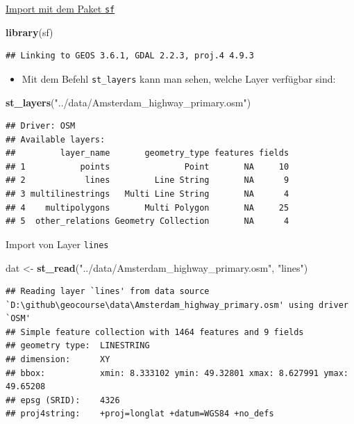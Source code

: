 \documentclass[ignorenonframetext,]{beamer}
\newenvironment{Shaded}{\begin{snugshade}}{\end{snugshade}}
\newcommand{\KeywordTok}[1]{\textcolor[rgb]{0.26,0.66,0.93}{\textbf{#1}}}
\newcommand{\NormalTok}[1]{\textcolor[rgb]{0.74,0.68,0.62}{#1}}
\newcommand{\StringTok}[1]{\textcolor[rgb]{0.02,0.61,0.04}{#1}}
\providecommand{\tightlist}{%
  \setlength{\itemsep}{0pt}\setlength{\parskip}{0pt}}
\begin{document}
\begin{frame}[fragile]{\href{https://cran.r-project.org/web/packages/sf/vignettes/sf2.html}{Import
mit dem Paket \texttt{sf}}}
\protect\hypertarget{import-mit-dem-paket-sf}{}

\begin{Shaded}
\begin{Highlighting}[]
\KeywordTok{library}\NormalTok{(sf)}
\end{Highlighting}
\end{Shaded}

\begin{verbatim}
## Linking to GEOS 3.6.1, GDAL 2.2.3, proj.4 4.9.3
\end{verbatim}

\begin{itemize}[<+->]
\tightlist
\item
  Mit dem Befehl \texttt{st\_layers} kann man sehen, welche Layer
  verfügbar sind:
\end{itemize}

\begin{Shaded}
\begin{Highlighting}[]
\KeywordTok{st_layers}\NormalTok{(}\StringTok{"../data/Amsterdam_highway_primary.osm"}\NormalTok{)}
\end{Highlighting}
\end{Shaded}

\begin{verbatim}
## Driver: OSM 
## Available layers:
##         layer_name       geometry_type features fields
## 1           points               Point       NA     10
## 2            lines         Line String       NA      9
## 3 multilinestrings   Multi Line String       NA      4
## 4    multipolygons       Multi Polygon       NA     25
## 5  other_relations Geometry Collection       NA      4
\end{verbatim}

\end{frame}

\begin{frame}[fragile]{Import von Layer \texttt{lines}}
\protect\hypertarget{import-von-layer-lines}{}

\begin{Shaded}
\begin{Highlighting}[]
\NormalTok{dat <-}\StringTok{ }\KeywordTok{st_read}\NormalTok{(}\StringTok{"../data/Amsterdam_highway_primary.osm"}\NormalTok{,}
               \StringTok{"lines"}\NormalTok{)}
\end{Highlighting}
\end{Shaded}

\begin{verbatim}
## Reading layer `lines' from data source `D:\github\geocourse\data\Amsterdam_highway_primary.osm' using driver `OSM'
## Simple feature collection with 1464 features and 9 fields
## geometry type:  LINESTRING
## dimension:      XY
## bbox:           xmin: 8.333102 ymin: 49.32801 xmax: 8.627991 ymax: 49.65208
## epsg (SRID):    4326
## proj4string:    +proj=longlat +datum=WGS84 +no_defs
\end{verbatim}

\end{frame}
\end{document}
